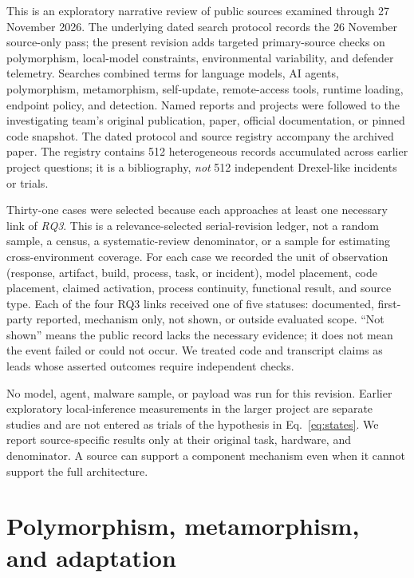 \documentclass[11pt,letterpaper]{article}
\begin{document}
This is an exploratory narrative review of public sources examined through 27 November 2026. The underlying dated search protocol records the 26 November source-only pass; the present revision adds targeted primary-source checks on polymorphism, local-model constraints, environmental variability, and defender telemetry. Searches combined terms for language models, AI agents, polymorphism, metamorphism, self-update, remote-access tools, runtime loading, endpoint policy, and detection. Named reports and projects were followed to the investigating team's original publication, paper, official documentation, or pinned code snapshot. The dated protocol and source registry accompany the archived paper. The registry contains 512 heterogeneous records accumulated across earlier project questions; it is a bibliography, \emph{not} 512 independent Drexel-like incidents or trials.

Thirty-one cases were selected because each approaches at least one necessary link of \emph{RQ3}. This is a relevance-selected serial-revision ledger, not a random sample, a census, a systematic-review denominator, or a sample for estimating cross-environment coverage. For each case we recorded the unit of observation (response, artifact, build, process, task, or incident), model placement, code placement, claimed activation, process continuity, functional result, and source type. Each of the four RQ3 links received one of five statuses: documented, first-party reported, mechanism only, not shown, or outside evaluated scope. ``Not shown'' means the public record lacks the necessary evidence; it does not mean the event failed or could not occur. We treated code and transcript claims as leads whose asserted outcomes require independent checks.

No model, agent, malware sample, or payload was run for this revision. Earlier exploratory local-inference measurements in the larger project are separate studies and are not entered as trials of the hypothesis in Eq.~\ref{eq:states}. We report source-specific results only at their original task, hardware, and denominator. A source can support a component mechanism even when it cannot support the full architecture.

\section{Polymorphism, metamorphism, and adaptation}\label{sec:polymorphism}
\end{document}
